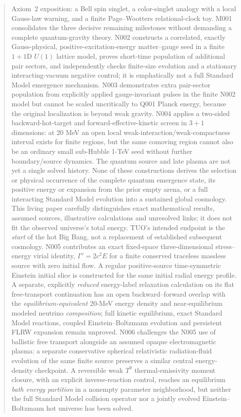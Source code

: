 \documentclass[11pt,a4paper]{article}
\theoremstyle{tmon}
\theoremstyle{definition}
\begin{document}
\begin{abstract}
Axiom~2 exposition: a Bell spin singlet, a color-singlet analogy with a local Gauss-law warning, and a finite Page--Wootters relational-clock toy. M001 consolidates the three decisive remaining milestones without demanding a complete quantum-gravity theory. N002 constructs a correlated, exactly Gauss-physical, positive-excitation-energy matter--gauge seed in a finite $1+1$D $U(1)$ lattice model, proves short-time population of additional pair sectors, and independently checks finite-size evolution and a stationary interacting-vacuum negative control; it is emphatically not a full Standard Model emergence mechanism. N003 demonstrates extra pair-sector population from explicitly applied gauge-invariant pulses in the finite N002 model but cannot be scaled uncritically to Q001 Planck energy, because the original localization is beyond weak gravity. N004 applies a two-sided backward-hot-target and forward-effective-kinetic screen in $3+1$ dimensions: at 20 MeV an open local weak-interaction/weak-compactness interval exists for finite regions, but the same comoving region cannot also be an ordinary small sub-Hubble 1-TeV seed without further boundary/source dynamics. The quantum source and late plasma are not yet a single solved history. None of these constructions derives the selection or physical occurrence of the complete quantum emergence state, its positive energy or expansion from the prior empty arena, or a full interacting Standard Model evolution into a sustained global cosmology. This living paper carefully distinguishes exact mathematical results, assumed sources, illustrative calculations and unresolved links; it does not fit the observed universe's total energy. TUO's intended endpoint is the \emph{start} of the hot Big Bang, not a replacement of established subsequent cosmology.
 N005 contributes an exact fixed-space three-dimensional stress--energy virial identity, $I''=2c^2E$ for a finite conserved traceless massless source with zero initial flow. A regular positive-source time-symmetric Einstein initial slice is constructed for the same initial radial energy profile. A separate, explicitly \emph{reduced} energy-label relaxation calculation on its flat free-transport continuation has an open backward--forward overlap with the \emph{equilibrium-equivalent} 20-MeV energy density and near-equilibrium modeled neutrino \emph{composition}; full kinetic equilibrium, exact Standard Model reactions, coupled Einstein--Boltzmann evolution and persistent FLRW expansion remain unproved.
 N006 challenges the N005 use of ballistic free transport alongside an assumed opaque electromagnetic plasma: a separate conservative spherical relativistic radiation-fluid evolution of the same finite source preserves a similar central energy-density checkpoint. A reversible weak $T^9$ thermal-emissivity moment closure, with an explicit inverse-reaction control, reaches an equilibrium \emph{bath energy partition} in a nonempty parameter neighborhood, but neither the full Standard Model collision operator nor a jointly evolved Einstein--Boltzmann hot universe has been solved.

\end{abstract}
\end{document}
